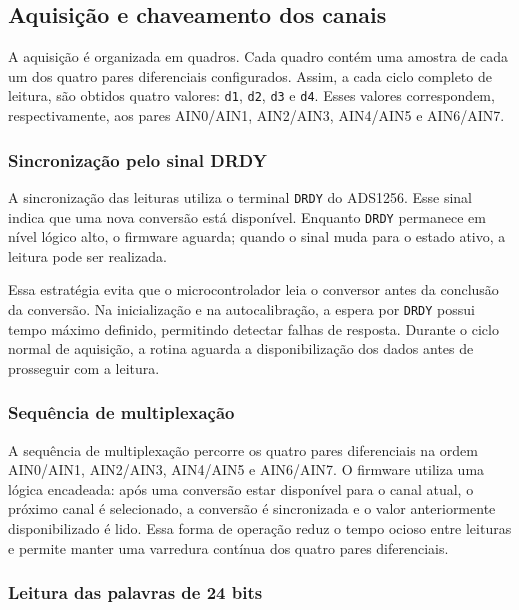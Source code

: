 \documentclass[a4paper,12pt]{fcte}
\begin{document}
\subsection{Aquisição e chaveamento dos canais}
\label{subsec:aquisicao_chaveamento_firmware}

A aquisição é organizada em quadros. Cada quadro contém uma amostra de cada um dos quatro pares diferenciais configurados. Assim, a cada ciclo completo de leitura, são obtidos quatro valores: \texttt{d1}, \texttt{d2}, \texttt{d3} e \texttt{d4}. Esses valores correspondem, respectivamente, aos pares AIN0/AIN1, AIN2/AIN3, AIN4/AIN5 e AIN6/AIN7.

\subsubsection{Sincronização pelo sinal DRDY}

A sincronização das leituras utiliza o terminal \texttt{DRDY} do ADS1256. Esse sinal indica que uma nova conversão está disponível. Enquanto \texttt{DRDY} permanece em nível lógico alto, o firmware aguarda; quando o sinal muda para o estado ativo, a leitura pode ser realizada.

Essa estratégia evita que o microcontrolador leia o conversor antes da conclusão da conversão. Na inicialização e na autocalibração, a espera por \texttt{DRDY} possui tempo máximo definido, permitindo detectar falhas de resposta. Durante o ciclo normal de aquisição, a rotina aguarda a disponibilização dos dados antes de prosseguir com a leitura.

\subsubsection{Sequência de multiplexação}

A sequência de multiplexação percorre os quatro pares diferenciais na ordem AIN0/AIN1, AIN2/AIN3, AIN4/AIN5 e AIN6/AIN7. O firmware utiliza uma lógica encadeada: após uma conversão estar disponível para o canal atual, o próximo canal é selecionado, a conversão é sincronizada e o valor anteriormente disponibilizado é lido. Essa forma de operação reduz o tempo ocioso entre leituras e permite manter uma varredura contínua dos quatro pares diferenciais.

\subsubsection{Leitura das palavras de 24 bits}
\end{document}
